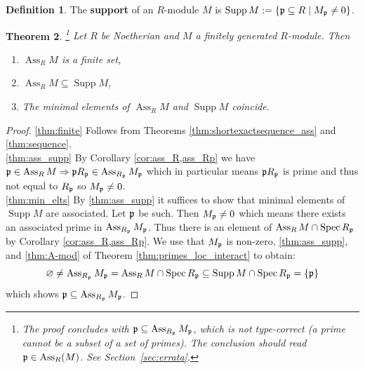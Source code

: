 \documentclass[12pt]{article}
\theoremstyle{plain}
\newtheorem{thm}{Theorem}[subsection] %
\theoremstyle{definition}
\newtheorem{defn}[thm]{Definition} %
\begin{document}
\begin{defn}
The \textbf{support} of an $R$-module $M$ is $\operatorname{Supp}M := \lbrace \frak{p} \subseteq R \mid M_\frak{p} \neq 0\rbrace$.
\end{defn}
\begin{thm}
\label{thm:fin_sub_min}\footnote{The proof concludes with $\frak{p}\subseteq\operatorname{Ass}_{R_\frak{p}}M_\frak{p}$, which is not type-correct (a prime cannot be a subset of a set of primes). The conclusion should read $\frak{p}\in\operatorname{Ass}_R(M)$. See Section~\ref{sec:errata}.}
Let $R$ be Noetherian and $M$ a finitely generated $R$-module. Then
\begin{enumerate}
    \item\label{thm:finite} $\operatorname{Ass}_RM$ is a finite set,
    \item\label{thm:ass_supp} $\operatorname{Ass}_RM \subseteq \operatorname{Supp}M$,
    \item\label{thm:min_elts} The minimal elements of $\operatorname{Ass}_RM$ and $\operatorname{Supp}M$ coincide.
\end{enumerate}
\end{thm}
\begin{proof}
\eqref{thm:finite} Follows from Theorems \ref{thm:shortexactsequence_ass} and \ref{thm:sequence}.\\
%
\eqref{thm:ass_supp} By Corollary \ref{cor:ass_R,ass_Rp} we have $\frak{p} \in \operatorname{Ass}_RM \Rightarrow \frak{p}R_{\frak{p}} \in \operatorname{Ass}_{R_\frak{p}}M_{\frak{p}}$ which in particular means $\frak{p}R_{\frak{p}}$ is prime and thus not equal to $R_\frak{p}$ so $M_\frak{p} \neq 0$.\\
%
\eqref{thm:min_elts} By \eqref{thm:ass_supp} it suffices to show that minimal elements of $\operatorname{Supp}M$ are associated. Let $\frak{p}$ be such. Then $M_\frak{p} \neq 0$ which means there exists an associated prime in $\operatorname{Ass}_{R_\frak{p}}M_\frak{p}$. Thus there is an element of $\operatorname{Ass}_RM \cap \operatorname{Spec}R_\frak{p}$ by Corollary \ref{cor:ass_R,ass_Rp}. We use that $M_\frak{p}$ is non-zero, \eqref{thm:ass_supp}, and \eqref{thm:A-mod} of Theorem \ref{thm:primes_loc_interact} to obtain:
\[\varnothing \neq \operatorname{Ass}_{R_\frak{p}}M_\frak{p} = \operatorname{Ass}_RM \cap \operatorname{Spec}R_{\frak{p}} \subseteq \operatorname{Supp}M \cap \operatorname{Spec}R_{\frak{p}} = \lbrace \frak{p} \rbrace\]
which shows $\frak{p} \subseteq \operatorname{Ass}_{R_\frak{p}}M_\frak{p}$.
\end{proof}
\end{document}
